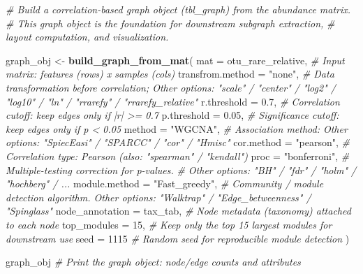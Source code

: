 \documentclass[
]{book}
\newenvironment{Shaded}{\begin{snugshade}}{\end{snugshade}}
\newcommand{\AttributeTok}[1]{\textcolor[rgb]{0.13,0.29,0.53}{#1}}
\newcommand{\CommentTok}[1]{\textcolor[rgb]{0.56,0.35,0.01}{\textit{#1}}}
\newcommand{\DecValTok}[1]{\textcolor[rgb]{0.00,0.00,0.81}{#1}}
\newcommand{\FloatTok}[1]{\textcolor[rgb]{0.00,0.00,0.81}{#1}}
\newcommand{\FunctionTok}[1]{\textcolor[rgb]{0.13,0.29,0.53}{\textbf{#1}}}
\newcommand{\NormalTok}[1]{#1}
\newcommand{\OtherTok}[1]{\textcolor[rgb]{0.56,0.35,0.01}{#1}}
\newcommand{\StringTok}[1]{\textcolor[rgb]{0.31,0.60,0.02}{#1}}
\begin{document}
\begin{Shaded}
\begin{Highlighting}[]
\CommentTok{\# Build a correlation{-}based graph object (tbl\_graph) from the abundance matrix.}
\CommentTok{\# This graph object is the foundation for downstream subgraph extraction,}
\CommentTok{\# layout computation, and visualization.}

\NormalTok{graph\_obj }\OtherTok{\textless{}{-}} \FunctionTok{build\_graph\_from\_mat}\NormalTok{(}
  \AttributeTok{mat              =}\NormalTok{ otu\_rare\_relative, }\CommentTok{\# Input matrix: features (rows) x samples (cols)}
  \AttributeTok{transfrom.method =} \StringTok{"none"}\NormalTok{,            }\CommentTok{\# Data transformation before correlation;  Other options: "scale" / "center" / "log2" / "log10" / "ln" / "rrarefy" / "rrarefy\_relative"}
  \AttributeTok{r.threshold      =} \FloatTok{0.7}\NormalTok{,               }\CommentTok{\# Correlation cutoff: keep edges only if |r| \textgreater{}= 0.7}
  \AttributeTok{p.threshold      =} \FloatTok{0.05}\NormalTok{,              }\CommentTok{\# Significance cutoff: keep edges only if p \textless{} 0.05}
  \AttributeTok{method           =} \StringTok{"WGCNA"}\NormalTok{,           }\CommentTok{\# Association method: Other options: "SpiecEasi" / "SPARCC" / "cor" / "Hmisc"}
  \AttributeTok{cor.method       =} \StringTok{"pearson"}\NormalTok{,         }\CommentTok{\# Correlation type: Pearson (also: "spearman" / "kendall")}
  \AttributeTok{proc             =} \StringTok{"bonferroni"}\NormalTok{,      }\CommentTok{\# Multiple{-}testing correction for p{-}values.}
                                        \CommentTok{\# Other options: "BH" / "fdr" / "holm" / "hochberg" / ...}
  \AttributeTok{module.method    =} \StringTok{"Fast\_greedy"}\NormalTok{,     }\CommentTok{\# Community / module detection algorithm.  Other options: "Walktrap" / "Edge\_betweenness" / "Spinglass"}
  \AttributeTok{node\_annotation  =}\NormalTok{ tax\_tab,           }\CommentTok{\# Node metadata (taxonomy) attached to each node}
  \AttributeTok{top\_modules      =} \DecValTok{15}\NormalTok{,                }\CommentTok{\# Keep only the top 15 largest modules for downstream use}
  \AttributeTok{seed             =} \DecValTok{1115}               \CommentTok{\# Random seed for reproducible module detection}
\NormalTok{)}

\NormalTok{graph\_obj                               }\CommentTok{\# Print the graph object: node/edge counts and attributes}
\end{Highlighting}
\end{Shaded}
\end{document}
